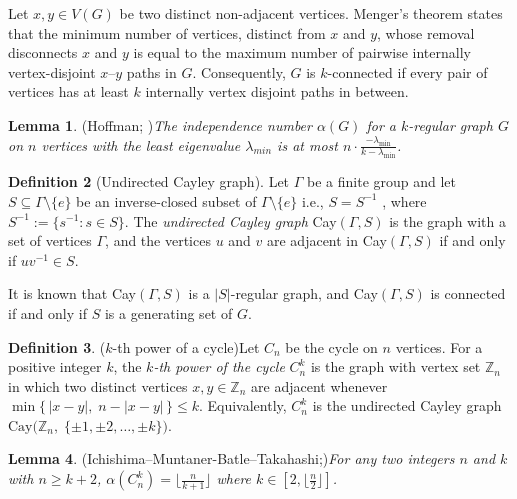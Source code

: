\documentclass[12pt,reqno,a4paper]{amsart}
\theoremstyle{definition}
\newtheorem{defn}{Definition}[section]
\newtheorem{lem}[defn]{Lemma}
\begin{document}
Let $x,y \in V(G)$ be two distinct non-adjacent vertices. Menger's theorem states that the minimum number of vertices, distinct from $x$ and $y$,  whose removal disconnects $x$ and $y$ 
is equal to the maximum number of pairwise internally vertex-disjoint $x$--$y$ paths in $G$.
Consequently, $G$ is $k$-connected if every pair of vertices has at least $k$ internally vertex disjoint paths in between.

\begin{lem}{(Hoffman; \cite[Theorem 1]{Hae2021})}\label{Lemma 2.2}
{\em The independence number $\alpha(G)$ for a $k$-regular graph $G$ on $n$ vertices with the least eigenvalue $\lambda_{min}$ is at most
$n\cdot\frac{-\lambda_{\min}}{k-\lambda_{\min}}$.}   
\end{lem}

\begin{defn}[Undirected Cayley graph]\label{Definition 2.3}
Let $\Gamma$ be a finite group and let $S \subseteq \Gamma \setminus \{e\}$ 
be an inverse-closed subset of $\Gamma \setminus \{e\}$ i.e., $S = S^{-1}$ , where 
$S^{-1}:= \{s^{-1}: s \in S\}$.
The \emph{undirected Cayley graph} Cay$(\Gamma, S)$ is the graph with a set of vertices $\Gamma$, and the vertices $u$ and $v$ are adjacent in Cay$(\Gamma, S)$ if and only if $uv^{-1} \in S$. 
\end{defn}

It is known that Cay$(\Gamma, S)$ is a $|S|$-regular graph, and Cay$(\Gamma, S)$ is
connected if and only if $S$ is a generating set of $G$.

\begin{defn}{($k$-th power of a cycle)}\label{Definition 2.4}
Let $C_{n}$ be the cycle on $n$ vertices.  
For a positive integer $k$, the \emph{$k$-th power of the cycle} $C_{n}^{k}$ is the graph with vertex set $\mathbb{Z}_{n}$ in which two distinct vertices $x,y\in \mathbb{Z}_{n}$ are adjacent whenever $\min\{\,|x-y|,\; n-|x-y|\,\}\le k$.
Equivalently, $C_{n}^{k}$ is the undirected Cayley graph
$\mathrm{Cay}\big(\mathbb{Z}_{n},\;\{\pm 1,\pm 2,\dots,\pm k\}\big)$.
\end{defn}

\begin{lem}{(Ichishima--Muntaner-Batle--Takahashi;\cite[Lemma 5]{IAT2025})}\label{Lemma 2.5}
{\em For any two integers $n$ and $k$ with $n \geq k + 2$,
$\alpha(C^{k}_{n})=\lfloor \frac{n}{k+1} \rfloor$ where $k\in [2,\lfloor \frac{n}{2}\rfloor]$.
}    
\end{lem}
\end{document}
